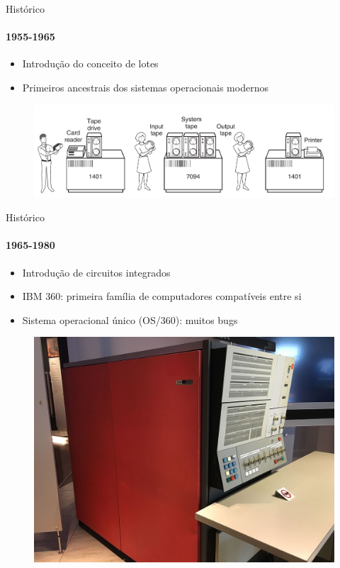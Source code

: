\documentclass{beamer}
\begin{document}
\begin{frame}{Histórico}
	\framesubtitle{1955-1965}
	\begin{itemize}
		\item Introdução do conceito de \alert{lotes}
		\item Primeiros ancestrais dos sistemas operacionais modernos
	\end{itemize}
	\begin{figure}
		\includegraphics[width=0.8\paperwidth]{resources/batch}
	\end{figure}
\end{frame}
\begin{frame}{Histórico}
	\framesubtitle{1965-1980}
	\begin{itemize}
		\item Introdução de circuitos integrados
		\item IBM 360: primeira família de computadores compatíveis entre si
		\item Sistema operacional único (OS/360): muitos bugs
	\end{itemize}
	\begin{figure}
		\includegraphics[width=0.5\paperwidth]{resources/ibm360}
	\end{figure}
\end{frame}
\end{document}
